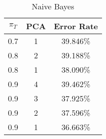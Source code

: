 \begin{center}
\begin{longtable}{|c|c|c|}
\caption{Naive Bayes}\label{tab:mvg_naiveacctable}\\
\hline
$\pi_T$ & PCA & Error Rate\\
\hline
0.7 & 1 & 39.846\% \\
\hline
0.8 & 2 & 39.188\% \\
\hline
0.8 & 1 & 38.090\% \\
\hline
0.9 & 4 & 39.462\% \\
\hline
0.9 & 3 & 37.925\% \\
\hline
0.9 & 2 & 37.596\% \\
\hline
0.9 & 1 & 36.663\% \\
\hline
\hline
\end{longtable}
\end{center}
